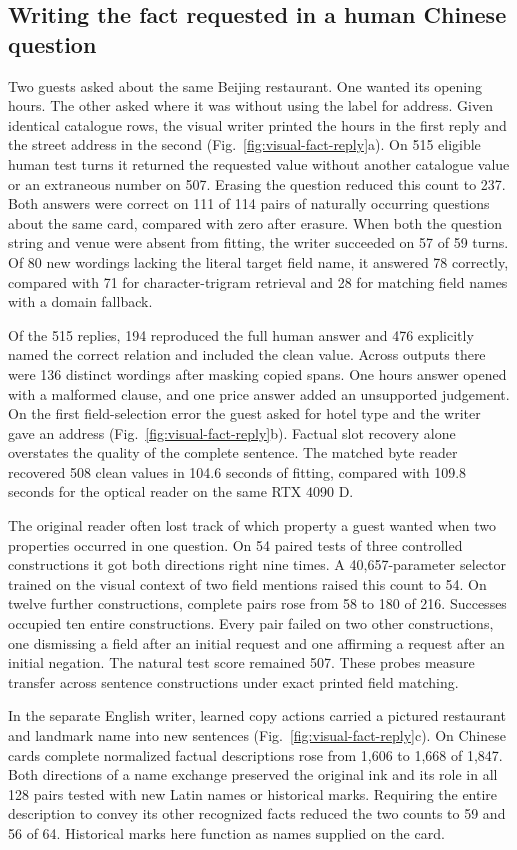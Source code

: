 \subsection*{Writing the fact requested in a human Chinese question}
Two guests asked about the same Beijing restaurant. One wanted its opening hours. The other asked where it was without using the label for address. Given identical catalogue rows, the visual writer printed the hours in the first reply and the street address in the second (Fig.~\ref{fig:visual-fact-reply}a). On 515 eligible human test turns it returned the requested value without another catalogue value or an extraneous number on 507. Erasing the question reduced this count to 237. Both answers were correct on 111 of 114 pairs of naturally occurring questions about the same card, compared with zero after erasure. When both the question string and venue were absent from fitting, the writer succeeded on 57 of 59 turns. Of 80 new wordings lacking the literal target field name, it answered 78 correctly, compared with 71 for character-trigram retrieval and 28 for matching field names with a domain fallback.

Of the 515 replies, 194 reproduced the full human answer and 476 explicitly named the correct relation and included the clean value. Across outputs there were 136 distinct wordings after masking copied spans. One hours answer opened with a malformed clause, and one price answer added an unsupported judgement. On the first field-selection error the guest asked for hotel type and the writer gave an address (Fig.~\ref{fig:visual-fact-reply}b). Factual slot recovery alone overstates the quality of the complete sentence. The matched byte reader recovered 508 clean values in 104.6 seconds of fitting, compared with 109.8 seconds for the optical reader on the same RTX 4090 D.

The original reader often lost track of which property a guest wanted when two properties occurred in one question. On 54 paired tests of three controlled constructions it got both directions right nine times. A 40,657-parameter selector trained on the visual context of two field mentions raised this count to 54. On twelve further constructions, complete pairs rose from 58 to 180 of 216. Successes occupied ten entire constructions. Every pair failed on two other constructions, one dismissing a field after an initial request and one affirming a request after an initial negation. The natural test score remained 507. These probes measure transfer across sentence constructions under exact printed field matching.

In the separate English writer, learned copy actions carried a pictured restaurant and landmark name into new sentences (Fig.~\ref{fig:visual-fact-reply}c). On Chinese cards complete normalized factual descriptions rose from 1,606 to 1,668 of 1,847. Both directions of a name exchange preserved the original ink and its role in all 128 pairs tested with new Latin names or historical marks. Requiring the entire description to convey its other recognized facts reduced the two counts to 59 and 56 of 64. Historical marks here function as names supplied on the card.
